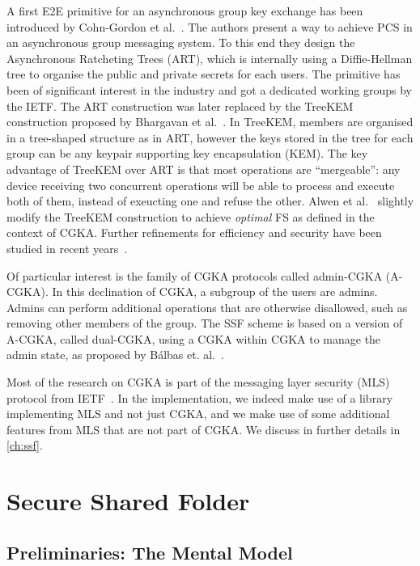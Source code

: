 A first E2E primitive for an asynchronous group key exchange 
has been introduced by Cohn-Gordon et al.~\cite{CCS:CCGMM18}.
The authors present a way to achieve PCS in an asynchronous group messaging system. 
To this end they design the Asynchronous Ratcheting Trees (ART),
which is internally using a Diffie-Hellman tree to organise the
public and private secrets for each users.
The primitive has been of significant interest in the industry and
got a dedicated working groups by the IETF.
The ART construction was later replaced by the TreeKEM
construction proposed by Bhargavan et al.~\cite{TreeKEM}.
In TreeKEM, members are organised in a tree-shaped structure
as in ART, however the keys stored in the tree for each group
can be any keypair supporting key encapsulation (KEM).
The key advantage of TreeKEM over ART is that
most operations are ``mergeable'':
any device receiving two
concurrent operations will be able to process and execute both of them,
instead of exeucting one and refuse the other.
Alwen et al.~\cite{C:ACDT20} slightly modify the TreeKEM construction
to achieve \textit{optimal} FS as defined in the context of CGKA.
Further refinements for efficiency and security have 
been studied in recent years~\cite{TCC:ACJM20, SP:KPWKCCMYAP21, CCS:ACDT21, CCS:AHKM22, EC:AANKPPW22, C:AlwJosMul22, C:AlwMulTse23, IWSPA:KEONO23}.

Of particular interest is the family of CGKA protocols called admin-CGKA (A-CGKA).
In this declination of CGKA, a subgroup of the users are admins. 
Admins can perform additional operations that are otherwise disallowed, such as removing other members of the group.
The SSF scheme is based on a version of A-CGKA, called dual-CGKA, using a CGKA within CGKA to manage the admin state, as proposed by
B{\'a}lbas et. al.~\cite{USENIX:BalColVau23}.

Most of the research on CGKA is part of the messaging layer security (MLS) protocol from IETF~\cite{rfc9420}.
In the implementation, we indeed make use of a library implementing MLS and not just CGKA,
and we make use of some additional features from MLS that are not part of CGKA.
We discuss in further details in \cref{ch:ssf}.

\section{Secure Shared Folder}\label{sc:SSF}

\subsection{Preliminaries: The Mental Model}\label{sc:mental-model}


